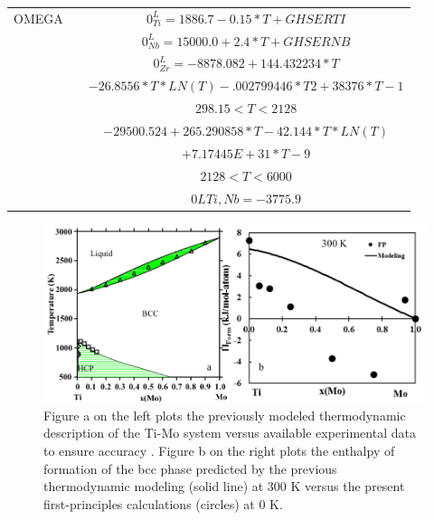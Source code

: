 \begin{longtable}[H]{ c c c }
                  OMEGA & \cite{Zhang2001} & $0^\textit{L}_{Ti} = 1886.7-0.15*T+GHSERTI$\\
                               & \cite{Zhang2001} &$0^\textit{L}_{Nb} = 15000.0+2.4*T+GHSERNB$\\
                               & \cite{Dinsdale1991} & $0^\textit{L}_{Zr} = -8878.082+144.432234*T$\\
                               &                               & $-26.8556*T*LN(T)-.002799446*T2+38376*T-1$\\                      
                               &      & $298.15 < T < 2128$\\
                               &      & $-29500.524+265.290858*T-42.144*T*LN(T)$\\
                               &      & $+7.17445E+31*T-9$\\          
                               &      &  $2128 < T< 6000$\\
                               & \cite{Zhang2001} & $0LTi,Nb = -3775.9$\\
		\hline
\end{longtable}



\newpage
\begin{figure}[H]
	\centering
	\includegraphics[width=\textwidth]{Chapter-3/Figures/TiMo.png}
	\caption{Figure a on the left plots the previously modeled thermodynamic description of the Ti-Mo system versus available experimental data to ensure accuracy \cite{Ansara1998,Murray1981}. Figure b on the right plots the enthalpy of formation of the bcc phase predicted by the previous thermodynamic modeling (solid line) at 300 K versus the present first-principles calculations (circles) at 0 K.}
	\label{Ch3-figure:TiMo}
\end{figure}

